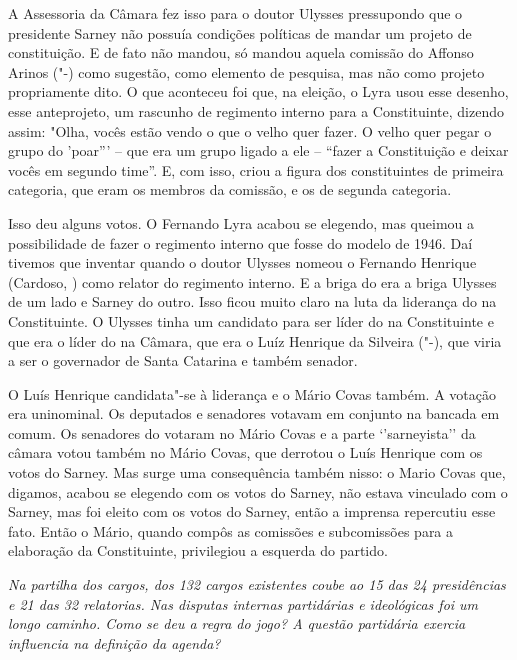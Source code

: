 A Assessoria da Câmara fez isso para o doutor Ulysses pressupondo que o
presidente Sarney não possuía condições políticas de mandar um projeto
de constituição. E de fato não mandou, só mandou aquela comissão do
Affonso Arinos ("-) como sugestão, como elemento de pesquisa, mas
não como projeto propriamente dito. O que aconteceu foi que, na eleição,
o Lyra usou esse desenho, esse anteprojeto, um rascunho de regimento
interno para a Constituinte, dizendo assim: "Olha, vocês estão vendo o
que o velho quer fazer. O velho quer pegar o grupo do 'poar''' -- que
era um grupo ligado a ele -- ``fazer a Constituição e deixar vocês em
segundo time''. E, com isso, criou a figura dos constituintes de
primeira categoria, que eram os membros da comissão, e os de segunda
categoria.

Isso deu alguns votos. O Fernando Lyra acabou se elegendo, mas queimou a
possibilidade de fazer o regimento interno que fosse do modelo de 1946.
Daí tivemos que inventar quando o doutor Ulysses nomeou o Fernando
Henrique (Cardoso, ) como relator do regimento interno. E a briga do
 era a briga Ulysses de um lado e Sarney do outro. Isso ficou muito
claro na luta da liderança do  na Constituinte. O Ulysses tinha um
candidato para ser líder do  na Constituinte e que era o líder do
 na Câmara, que era o Luíz Henrique da Silveira ("-), que viria
a ser o governador de Santa Catarina e também senador.

O Luís Henrique candidata"-se à liderança e o Mário Covas também. A
votação era uninominal. Os deputados e senadores votavam em conjunto na
bancada em comum. Os senadores do  votaram no Mário Covas e a parte
`'sarneyista'' da câmara votou também no Mário Covas, que derrotou o
Luís Henrique com os votos do Sarney. Mas surge uma consequência também
nisso: o Mario Covas que, digamos, acabou se elegendo com os votos do
Sarney, não estava vinculado com o Sarney, mas foi eleito com os votos
do Sarney, então a imprensa repercutiu esse fato. Então o Mário, quando
compôs as comissões e subcomissões para a elaboração da Constituinte,
privilegiou a esquerda do partido.

\medskip

\noindent\emph{Na partilha dos cargos, dos 132 cargos existentes coube ao 
15 das 24 presidências e 21 das 32 relatorias. Nas disputas internas
partidárias e ideológicas foi um longo caminho. Como se deu a regra do
jogo? A questão partidária exercia influencia na definição da agenda?}

